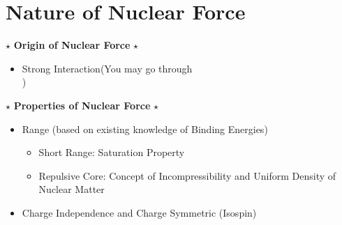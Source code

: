 \chapter{Nature of Nuclear Force}

    \begin{tcolorbox} [colframe=blue!10!black,colback=yellow!29.05!white,arc=1em,fonttitle=\bfseries,title= Key Objectives:, width = \textwidth]
        $\star$ \textbf{Origin of Nuclear Force} $\star$
        \begin{itemize}
            \item Strong Interaction(You may go through \\ )
        \end{itemize}
       $\star$ \textbf{Properties of Nuclear Force} $\star$ 
       \begin{itemize}
             \item Range (based on existing knowledge of Binding Energies) 
                \begin{itemize}
                    \item Short Range: Saturation Property
                    \item Repulsive Core: Concept of Incompressibility and Uniform Density of Nuclear Matter
                \end{itemize}
             \item Charge Independence and Charge Symmetric (Isospin)
       \end{itemize}
     \end{tcolorbox}
     
